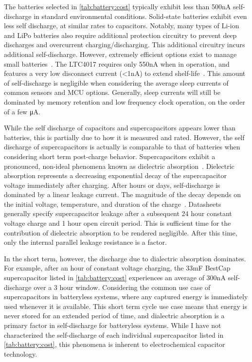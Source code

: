 The batteries selected in \cref{tab:battery:cost} typically exhibit less than 500\si{\nano\ampere} self-discharge in standard environmental conditions. Solid-state batteries exhibit even less self discharge, at similar rates to capacitors. Notably, many types of Li-ion and LiPo batteries also require additional protection circuitry to prevent deep discharges and overcurrent charging/discharging. This additional circuitry incurs additional self-discharge. However, extremely efficient options exist to manage small batteries~\cite{ltc4071Datasheet,bq25505,adp5091}. The LTC4017 requires only 550\si{\nano\ampere} when in operation, and features a very low disconnect current (<1\si{\nano\ampere}) to extend shelf-life~\cite{ltc4071Datasheet}.
This amount of self-discharge is negligible when considering the average sleep currents of common sensors and MCU options. Generally, sleep currents will still be dominated by memory retention and low frequency clock operation, on the order of a few \si{\micro\ampere}. 

While the self discharge of capacitors and supercapacitors appears lower than batteries, this is partially due to how it is measured and rated. However, the self discharge of supercapacitors is actually is comparable to that of batteries when considering short term post-charge behavior.
Supercapacitors exhibit a pronounced, non-ideal phenomena known as dielectric absorption~\cite{kundert2008modeling}. Dielectric absorption represents a decreasing exponential decay of the supercapacitor voltage immediately after charging. After hours or days, self-discharge is dominated by a linear leakage current. The magnitude of the decay depends on the initial voltage, temperature, and duration of the charge~\cite{kowal2011detailed}. Datasheets generally specify supercapacitor leakage after a subsequent 24 hour constant voltage charge and 1 hour open circuit period. This is sufficient time for the contribution of dielectric absorption to be rendered negligible. After this time, only the internal parallel leakage resistance is a factor.

In the short term, however, the discharge due to dialectric absorption dominates. For example, after an hour of constant voltage charging, the 33\si{\milli\farad} BestCap supercapacitor listed in \cref{tab:battery:cost} experiences an average of 300\si{\nano\ampere} self-discharge over a 3 hour window. Considering the common use case of supercapacitors in batteryless systems, where any captured energy is immediately used whenever it is available. This short term cycle use case means that energy is never stored for an extended period of time, and dialectric absorption is a primary factor in self-discharge for batteryless systems. While I have not characterized the self-discharge of each individual supercapacitor listed in \cref{tab:battery:cost}, this phenomena is inherent to electrochemical capacitor technology.

